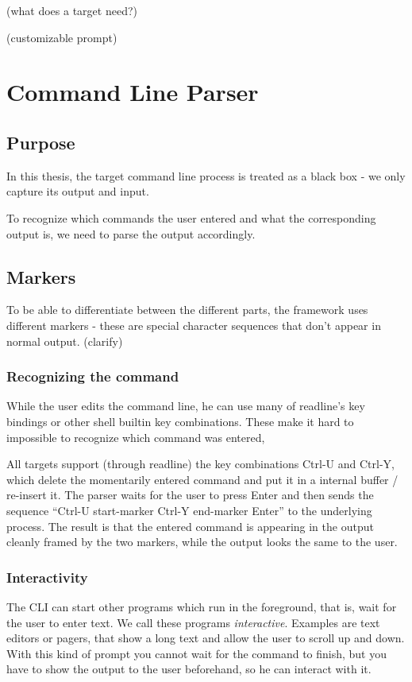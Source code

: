 \documentclass[twoside]{scrreprt}
\begin{document}
(what does a target need?)

(customizable prompt)

\chapter{Command Line Parser}

\section{Purpose}

In this thesis, the target command line process is treated as a black box - we only capture its output and input.

To recognize which commands the user entered and what the corresponding output is, we need to parse the output accordingly.

\section{Markers}

To be able to differentiate between the different parts, the framework uses different markers - these are special character sequences that don't appear in normal output. (clarify)

\subsection{Recognizing the command}

While the user edits the command line, he can use many of readline's key bindings or other shell builtin key combinations. These make it hard to impossible to recognize which command was entered, 

All targets support (through readline) the key combinations Ctrl-U and Ctrl-Y, which delete the momentarily entered command and put it in a internal buffer / re-insert it. The parser waits for the user to press Enter and then sends the sequence “Ctrl-U start-marker Ctrl-Y end-marker Enter” to the underlying process. The result is that the entered command is appearing in the output cleanly framed by the two markers, while the output looks the same to the user.

\subsection{Interactivity}

The CLI can start other programs which run in the foreground, that is, wait for the user to enter text. We call these programs \emph{interactive}. Examples are text editors or pagers, that show a long text and allow the user to scroll up and down. With this kind of prompt you cannot wait for the command to finish, but you have to show the output to the user beforehand, so he can interact with it.
\end{document}

